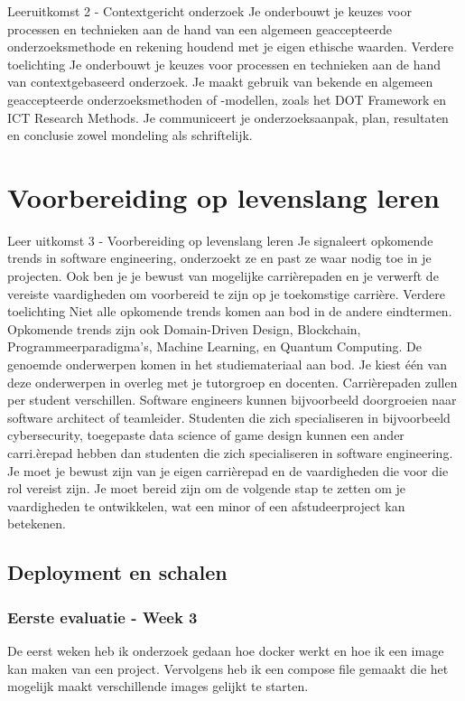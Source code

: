 Leeruitkomst 2 - Contextgericht onderzoek Je onderbouwt je keuzes voor processen en technieken aan de hand van een algemeen geaccepteerde onderzoeksmethode en rekening houdend met je eigen ethische waarden.
Verdere toelichting Je onderbouwt je keuzes voor processen en technieken aan de hand van contextgebaseerd onderzoek.
Je maakt gebruik van bekende en algemeen geaccepteerde onderzoeksmethoden of -modellen, zoals het DOT Framework en ICT Research Methods.
Je communiceert je onderzoeksaanpak, plan, resultaten en conclusie zowel mondeling als schriftelijk.





\section{Voorbereiding op levenslang leren}\label{sec:voorbereiding-op-levenslang-leren}
Leer uitkomst 3 - Voorbereiding op levenslang leren Je signaleert opkomende trends in software engineering, onderzoekt ze en past ze waar nodig toe in je projecten.
Ook ben je je bewust van mogelijke carrièrepaden en je verwerft de vereiste vaardigheden om voorbereid te zijn op je toekomstige carrière.
Verdere toelichting Niet alle opkomende trends komen aan bod in de andere eindtermen.
Opkomende trends zijn ook Domain-Driven Design, Blockchain, Programmeerparadigma's, Machine Learning, en Quantum Computing.
De genoemde onderwerpen komen in het studiemateriaal aan bod.
Je kiest één van deze onderwerpen in overleg met je tutorgroep en docenten.
Carrièrepaden zullen per student verschillen.
Software engineers kunnen bijvoorbeeld doorgroeien naar software architect of teamleider.
Studenten die zich specialiseren in bijvoorbeeld cybersecurity, toegepaste data science of game design kunnen een ander carri.èrepad hebben dan studenten die zich specialiseren in software engineering.
Je moet je bewust zijn van je eigen carrièrepad en de vaardigheden die voor die rol vereist zijn.
Je moet bereid zijn om de volgende stap te zetten om je vaardigheden te ontwikkelen, wat een minor of een afstudeerproject kan betekenen.

\subsection{Deployment en schalen}\label{subsec:deployen-en-schalen}
	\subsubsection{Eerste evaluatie - Week 3}\label{subsubsec:eerste-evaluatie---week-3}
	De eerst weken heb ik onderzoek gedaan hoe docker werkt en hoe ik een image kan maken van een project.
	Vervolgens heb ik een compose file gemaakt die het mogelijk maakt verschillende images gelijkt te starten.

